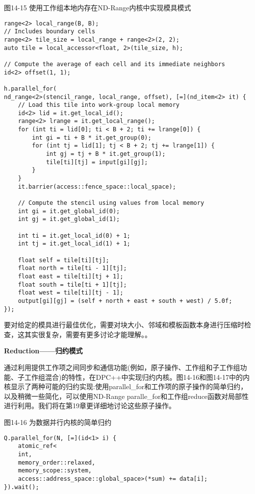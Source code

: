 \hspace*{\fill} \par %
图14-15 使用工作组本地内存在ND-Range内核中实现模具模式
\begin{lstlisting}[caption={}]
range<2> local_range(B, B);
// Includes boundary cells
range<2> tile_size = local_range + range<2>(2, 2);
auto tile = local_accessor<float, 2>(tile_size, h);

// Compute the average of each cell and its immediate neighbors
id<2> offset(1, 1);

h.parallel_for(
nd_range<2>(stencil_range, local_range, offset), [=](nd_item<2> it) {
	// Load this tile into work-group local memory
	id<2> lid = it.get_local_id();
	range<2> lrange = it.get_local_range();
	for (int ti = lid[0]; ti < B + 2; ti += lrange[0]) {
		int gi = ti + B * it.get_group(0);
		for (int tj = lid[1]; tj < B + 2; tj += lrange[1]) {
			int gj = tj + B * it.get_group(1);
			tile[ti][tj] = input[gi][gj];
		}
	}
	it.barrier(access::fence_space::local_space);
	
	// Compute the stencil using values from local memory
	int gi = it.get_global_id(0);
	int gj = it.get_global_id(1);
	
	int ti = it.get_local_id(0) + 1;
	int tj = it.get_local_id(1) + 1;
	
	float self = tile[ti][tj];
	float north = tile[ti - 1][tj];
	float east = tile[ti][tj + 1];
	float south = tile[ti + 1][tj];
	float west = tile[ti][tj - 1];
	output[gi][gj] = (self + north + east + south + west) / 5.0f;
});
\end{lstlisting}

要对给定的模具进行最佳优化，需要对块大小、邻域和模板函数本身进行压缩时检查，这其实很复杂，需要有更多讨论才能理解。。\par

\hspace*{\fill} \par %
\textbf{Reduction——归约模式}

通过利用提供工作项之间同步和通信功能(例如，原子操作、工作组和子工作组功能、子工作组混合)的特性，在DPC++中实现归约内核。图14-16和图14-17中的内核显示了两种可能的归约实现:使用parallel\_for和工作项的原子操作的简单归约，以及稍微一些简化，可以使用ND-Range paralle\_for和工作组reduce函数对局部性进行利用。我们将在第19章更详细地讨论这些原子操作。\par

\hspace*{\fill} \par %
图14-16 为数据并行内核的简单归约
\begin{lstlisting}[caption={}]
Q.parallel_for(N, [=](id<1> i) {
	atomic_ref<
	int,
	memory_order::relaxed,
	memory_scope::system,
	access::address_space::global_space>(*sum) += data[i];
}).wait();
\end{lstlisting}

